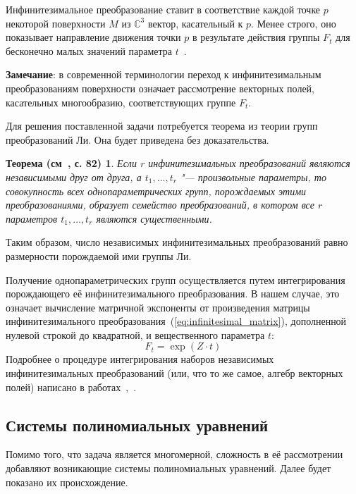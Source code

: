 \documentclass[../main.tex]{subfiles}
\newtheorem*{lie_theorem}{Теорема (см~\cite{lie}, с. 82)}
\begin{document}
Инфинитезимальное преобразование ставит в соответствие каждой точке $p$ некоторой поверхности $M$ из $\mathbb{C}^3$ вектор, касательный к $p$. Менее строго, оно показывает направление движения точки $p$ в результате действия группы $F_t$ для бесконечно малых значений параметра $t$~\cite{lie}.

\textbf{Замечание}: в современной терминологии переход к инфинитезимальным преобразованиям поверхности означает рассмотрение векторных полей, касательных многообразию, соответствующих группе $F_t$.

Для решения поставленной задачи потребуется теорема из теории групп преобразований Ли. Она будет приведена без доказательства.
\begin{lie_theorem}\label{thm:lie}
Если $r$ инфинитезимальных преобразований являются независимыми друг от друга, а $t_1,\hdots,t_r$ "--- произвольные параметры, то совокупность всех однопараметрических групп, порождаемых этими преобразованиями, образует семейство преобразований, в котором все $r$  параметров $t_1,\hdots,t_r$ являются существенными.
\end{lie_theorem}

Таким образом, число независимых инфинитезимальных преобразований равно размерности порождаемой ими группы Ли.

Получение однопараметрических групп осуществляется путем интегрирования порождающего её инфинитезимального преобразования. В нашем случае, это означает вычисление матричной экспоненты от произведения матрицы инфинитезимального преобразования~(\ref{eq:infinitesimal_matrix}), дополненной нулевой строкой до квадратной, и вещественного параметра $t$:
$$
	F_t = \exp(Z \cdot t)
$$
Подробнее о процедуре интегрирования наборов независимых инфинитезимальных преобразований (или, что то же самое, алгебр векторных полей) написано в работах~\cite{loboda_hodarev},~\cite{fels}.

\subsection{Системы полиномиальных уравнений}
Помимо того, что задача является многомерной, сложность в её рассмотрении добавляют возникающие системы полиномиальных уравнений. Далее будет показано их происхождение.
\end{document}

